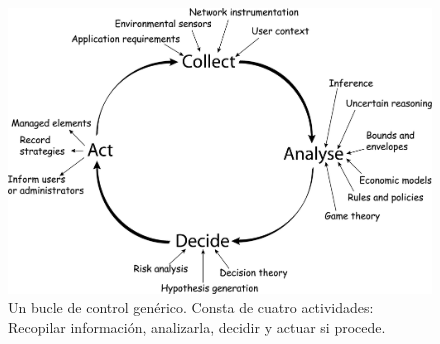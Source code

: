 \begin{figure}[h]
  \centering
  \includegraphics[scale=0.07]{01_introduccion/images/feedback-loop}
  \caption[Un bucle de control genérico. Consta de cuatro actividades: Recopilar información, analizarla, decidir y actuar si procede.]{Un bucle de control genérico. Consta de cuatro actividades: Recopilar información, analizarla, decidir y actuar si procede. \cite{dobsonSurveyAutonomicCommunications2006}}
  \label{fig:bucle-control}
\end{figure}

